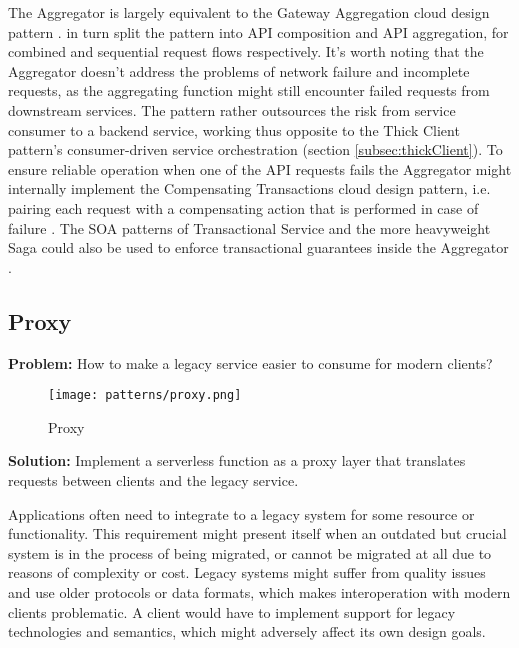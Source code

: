 The Aggregator is largely equivalent to the Gateway Aggregation cloud design pattern \parencite{microsoft18cloudPatterns}. \textcite{baldini17currentTrends} in turn split the pattern into API composition and API aggregation, for combined and sequential request flows respectively. It's worth noting that the Aggregator doesn't address the problems of network failure and incomplete requests, as the aggregating function might still encounter failed requests from downstream services. The pattern rather outsources the risk from service consumer to a backend service, working thus opposite to the Thick Client pattern's consumer-driven service orchestration (section \ref{subsec:thickClient}). To ensure reliable operation when one of the API requests fails the Aggregator might internally implement the Compensating Transactions cloud design pattern, i.e. pairing each request with a compensating action that is performed in case of failure \parencite{microsoft18cloudPatterns}. The SOA patterns of Transactional Service and the more heavyweight Saga could also be used to enforce transactional guarantees inside the Aggregator \parencite{rotem12soa}.

\subsection{Proxy} \label{subsec:proxy}

\textbf{Problem:} How to make a legacy service easier to consume for modern clients?

\begin{figure}[h]
  \centering
  \texttt{[image: patterns/proxy.png]}
  \caption{Proxy}
  \label{fig:proxy}
\end{figure}

\textbf{Solution:} Implement a serverless function as a proxy layer that translates requests between clients and the legacy service.

Applications often need to integrate to a legacy system for some resource or functionality. This requirement might present itself when an outdated but crucial system is in the process of being migrated, or cannot be migrated at all due to reasons of complexity or cost. Legacy systems might suffer from quality issues and use older protocols or data formats, which makes interoperation with modern clients problematic. A client would have to implement support for legacy technologies and semantics, which might adversely affect its own design goals. \parencite{microsoft18cloudPatterns}

